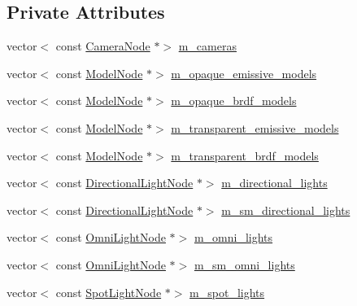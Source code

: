 \subsection*{Private Attributes}
\begin{DoxyCompactItemize}
\item 
vector$<$ const \hyperlink{classmage_1_1_camera_node}{Camera\+Node} $\ast$$>$ \hyperlink{structmage_1_1_pass_buffer_a4885440342be6a2cd11002781704a63f}{m\+\_\+cameras}
\item 
vector$<$ const \hyperlink{classmage_1_1_model_node}{Model\+Node} $\ast$$>$ \hyperlink{structmage_1_1_pass_buffer_a6a2c8f757aca5b28eda0bec25f412e05}{m\+\_\+opaque\+\_\+emissive\+\_\+models}
\item 
vector$<$ const \hyperlink{classmage_1_1_model_node}{Model\+Node} $\ast$$>$ \hyperlink{structmage_1_1_pass_buffer_a7b866f3637755bfb2d951fe8a3495bea}{m\+\_\+opaque\+\_\+brdf\+\_\+models}
\item 
vector$<$ const \hyperlink{classmage_1_1_model_node}{Model\+Node} $\ast$$>$ \hyperlink{structmage_1_1_pass_buffer_a6eeb7390dcdc25022e887ce110ff1fff}{m\+\_\+transparent\+\_\+emissive\+\_\+models}
\item 
vector$<$ const \hyperlink{classmage_1_1_model_node}{Model\+Node} $\ast$$>$ \hyperlink{structmage_1_1_pass_buffer_a2697c5e89c8e654ada78cbf15f5e8067}{m\+\_\+transparent\+\_\+brdf\+\_\+models}
\item 
vector$<$ const \hyperlink{namespacemage_a7637b5351fc0f66a10badd80ebb35899}{Directional\+Light\+Node} $\ast$$>$ \hyperlink{structmage_1_1_pass_buffer_a20f2a4518ea6121e6c9ae0ed9d263435}{m\+\_\+directional\+\_\+lights}
\item 
vector$<$ const \hyperlink{namespacemage_a7637b5351fc0f66a10badd80ebb35899}{Directional\+Light\+Node} $\ast$$>$ \hyperlink{structmage_1_1_pass_buffer_aa1161b50d505260607bda900f6856e0b}{m\+\_\+sm\+\_\+directional\+\_\+lights}
\item 
vector$<$ const \hyperlink{namespacemage_a1724c6e6b6b5ba535cdd967cbbb4a669}{Omni\+Light\+Node} $\ast$$>$ \hyperlink{structmage_1_1_pass_buffer_ab4553bc8afe80eff1f52d511cd23e90b}{m\+\_\+omni\+\_\+lights}
\item 
vector$<$ const \hyperlink{namespacemage_a1724c6e6b6b5ba535cdd967cbbb4a669}{Omni\+Light\+Node} $\ast$$>$ \hyperlink{structmage_1_1_pass_buffer_a49209cf46f4e6c2328eb8a36d647a2d9}{m\+\_\+sm\+\_\+omni\+\_\+lights}
\item 
vector$<$ const \hyperlink{namespacemage_aeed5dee4ff6c591eabb0e9114256df4a}{Spot\+Light\+Node} $\ast$$>$ \hyperlink{structmage_1_1_pass_buffer_a45b9dd8e0ecb9c0110b53a5a744519bb}{m\+\_\+spot\+\_\+lights}

\end{DoxyCompactItemize}
